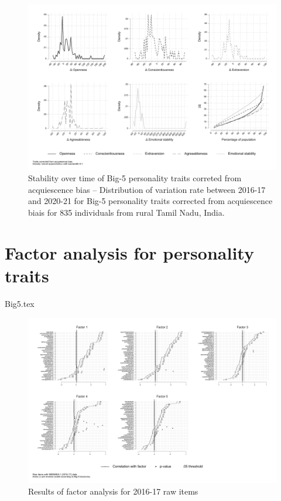 \documentclass[a4paper, 11pt, onecolumn]{article}
\begin{document}
\begin{figure}[!htb]
\raggedright
\includegraphics[scale=0.86]{INPUT/deltacont_cor}
\caption{Stability over time of Big-5 personality traits correted from acquiescence bias -- Distribution of variation rate between 2016-17 and 2020-21 for Big-5 personality traits corrected from acquiescence biais for 835 individuals from rural Tamil Nadu, India.}
\label{fig:stabcor}
\end{figure}



\clearpage
\newpage
\section{Factor analysis for personality traits}
\label{section:efa_big5}


{Big5.tex}

\clearpage
\begin{figure}[!htb]
\raggedright
\includegraphics[width=\textwidth, angle=0]{INPUT/factor2016_2}
\caption{Results of factor analysis for 2016-17 raw items}
\label{fig:resefa}
\end{figure}
\end{document}
